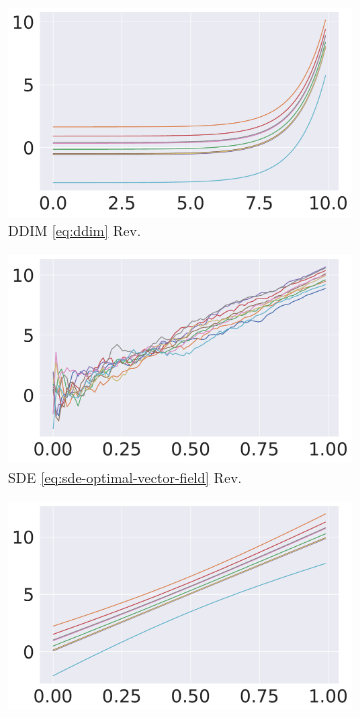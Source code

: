 \documentclass{article} %
\theoremstyle{plain}
\begin{document}
\begin{figure}[!tbh]
\begin{subfigure}[b]{0.24\columnwidth}
         \includegraphics[width=\linewidth]{pics/ddim-inv.pdf}
        \caption{DDIM \eqref{eq:ddim} Rev.}
     \end{subfigure}
     \begin{subfigure}[b]{0.24\columnwidth}
         \centering
         \includegraphics[width=\linewidth]{pics/rf-sde-inv.pdf}
        \caption{SDE \eqref{eq:sde-optimal-vector-field} Rev.}
     \end{subfigure}
     \begin{subfigure}[b]{0.24\columnwidth}
         \centering
         \includegraphics[width=\linewidth]{pics/rf-inv.pdf}

\end{subfigure}
\end{figure}
\end{document}
